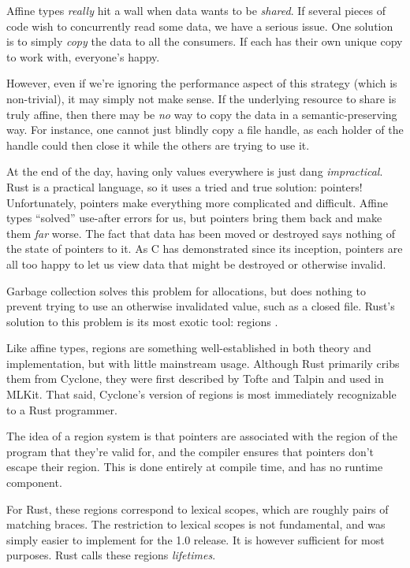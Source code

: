 Affine types \emph{really} hit a wall when data wants to be \emph{shared}. If
several pieces of code wish to concurrently read some data, we have a serious
issue. One solution is to simply \emph{copy} the data to all the consumers. If each
has their own unique copy to work with, everyone's happy.

However, even if we're ignoring the performance aspect of this strategy (which
is non-trivial), it may simply not make sense. If the underlying resource to
share is truly affine, then there may be \emph{no} way to copy the data in a
semantic-preserving way. For instance, one cannot just blindly copy a file
handle, as each holder of the handle could then close it while the others are
trying to use it.

At the end of the day, having only values everywhere is just dang \emph{impractical}.
Rust is a practical language, so it uses a tried and true solution: pointers! Unfortunately,
pointers make everything more complicated and difficult. Affine types ``solved''
use-after errors for us, but pointers bring them back and make them \emph{far} worse.
The fact that data has been moved or destroyed says nothing of the state of
pointers to it. As C has demonstrated since its inception, pointers are all too
happy to let us view data that might be destroyed or otherwise invalid.

Garbage collection solves this problem for allocations, but does nothing to
prevent trying to use an otherwise invalidated value, such as a closed file.
Rust's solution to this problem is its most exotic tool: regions \cite{swamy2006safe}.

Like affine types, regions are something well-established in both theory and
implementation, but with little mainstream usage. Although Rust primarily cribs
them from Cyclone, they were first described by Tofte and Talpin \cite{tofte1997region}
and used in MLKit. That said, Cyclone's version of regions
is most immediately recognizable to a Rust programmer.

The idea of a region system is that pointers are associated with the region of
the program that they're valid for, and the compiler ensures that pointers don't
escape their region. This is done entirely at compile time, and has no runtime
component.

For Rust, these regions correspond to lexical scopes, which are roughly
pairs of matching braces. The restriction to lexical scopes is not fundamental,
and was simply easier to implement for the 1.0 release. It is however sufficient
for most purposes. Rust calls these regions \emph{lifetimes}.

